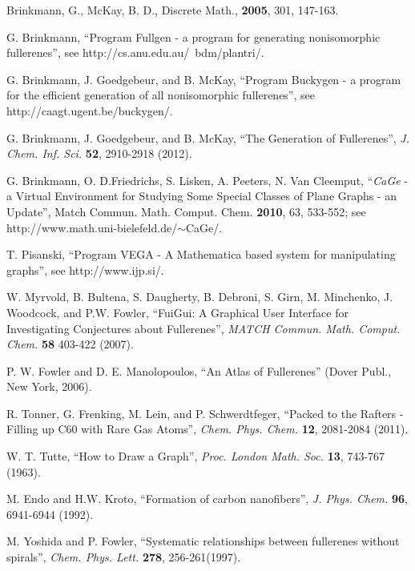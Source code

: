 \documentclass[article,a4paper,twoside]{memoir}
\newcommand{\program}[1]{\textit{#1}}
\begin{document}
\clearpage
\begin{thebibliography}{99}

 Brinkmann, G., McKay, B. D., Discrete Math., \textbf{2005}, 301, 147-163.

 G. Brinkmann, ``Program Fullgen - a program for generating nonisomorphic fullerenes'', see http://cs.anu.edu.au/~bdm/plantri/.
 
 G. Brinkmann, J. Goedgebeur, and B. McKay, ``Program Buckygen - a program for the efficient generation of all nonisomorphic fullerenes'',
see http://caagt.ugent.be/buckygen/.

 G. Brinkmann, J. Goedgebeur, and B. McKay, ``The Generation of Fullerenes'', \textit{J. Chem. Inf. Sci.} \textbf{52}, 2910-2918 (2012).

 G. Brinkmann, O. D.Friedrichs, S. Lisken, A. Peeters, N. Van Cleemput, ``\program{CaGe} - a Virtual Environment for Studying Some Special 
Classes of Plane Graphs - an Update'', Match Commun. Math. Comput. Chem. \textbf{2010}, 63, 533-552; see http://www.math.uni-bielefeld.de/$\sim$CaGe/.

 T. Pisanski, ``Program VEGA - A Mathematica based system for manipulating graphs'', see http://www.ijp.si/.

 W. Myrvold, B. Bultena, S. Daugherty, B. Debroni, S. Girn, M. Minchenko, J. Woodcock, and P.W. Fowler,
``FuiGui: A Graphical User Interface for Investigating Conjectures about Fullerenes'', \textit{MATCH Commun. Math. Comput. Chem.} \textbf{58} 403-422 (2007).

 P. W. Fowler and D. E. Manolopoulos, ``An Atlas of Fullerenes'' (Dover Publ., New York, 2006).
 
 R. Tonner, G. Frenking, M. Lein, and P. Schwerdtfeger, ``Packed to the Rafters - Filling up C60 with Rare Gas Atoms'', 
\textit{Chem. Phys. Chem.} \textbf{12}, 2081-2084 (2011).

 W. T. Tutte, ``How to Draw a Graph'', \textit{Proc. London Math. Soc.} \textbf{13}, 743-767 (1963).

 M. Endo and H.W. Kroto, ``Formation of carbon nanofibers'', \textit{J. Phys. Chem.} \textbf{96}, 6941-6944 (1992).

 M. Yoshida and P. Fowler, ``Systematic relationships between fullerenes without spirals'', \textit{Chem. Phys. Lett.} \textbf{278}, 256-261(1997).


\end{thebibliography}
\end{document}
